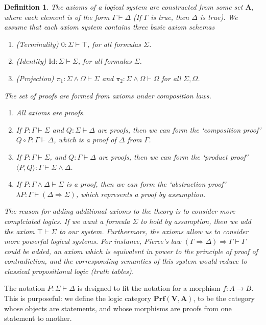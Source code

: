 \documentclass{article}
\theoremstyle{plain}
\newtheorem{definition}{Definition}
\begin{document}
\begin{definition}
    The axioms of a logical system are constructed from some set $\mathbf{A}$, where each element is of the form $\Gamma \vdash \Delta$ (If $\Gamma$ is true, then $\Delta$ is true). We assume that each axiom system contains three basic axiom schemas
    \begin{enumerate}
        \item(Terminality) $0: \Sigma \vdash \top$, for all formulas $\Sigma$.
        \item(Identity) $\text{Id}: \Sigma \vdash \Sigma$, for all formulas $\Sigma$.
        \item(Projection) $\pi_1: \Sigma \wedge \Omega \vdash \Sigma$ and $\pi_2: \Sigma \wedge \Omega \vdash \Omega$ for all $\Sigma, \Omega$.
    \end{enumerate}
    The set of proofs are formed from axioms under composition laws.
    \begin{enumerate}
        \item All axioms are proofs.
        \item If $P: \Gamma \vdash \Sigma$ and $Q: \Sigma \vdash \Delta$ are proofs, then we can form the `composition proof' $Q \circ P: \Gamma \vdash \Delta$, which is a proof of $\Delta$ from $\Gamma$.
        \item If $P: \Gamma \vdash \Sigma$, and $Q: \Gamma \vdash \Delta$ are proofs, then we can form the `product proof' $\langle P,Q \rangle: \Gamma \vdash \Sigma \wedge \Delta$.
        \item If $P: \Gamma \wedge \Delta \vdash \Sigma$ is a proof, then we can form the `abstraction proof' $\lambda P: \Gamma \vdash (\Delta \Rightarrow \Sigma)$, which represents a proof by assumption.
    \end{enumerate}
    The reason for adding additional axioms to the theory is to consider more complciated logics. If we want a formula $\Sigma$ to hold by assumption, then we add the axiom $\top \vdash \Sigma$ to our system. Furthermore, the axioms allow us to consider more powerful logical systems. For instance, Pierce's law $(\Gamma \Rightarrow \Delta) \Rightarrow \Gamma \vdash \Gamma$ could be added, an axiom which is equivalent in power to the principle of proof of contradiction, and the corresponding semantics of this system would reduce to classical propositional logic (truth tables).
\end{definition}

The notation $P: \Sigma \vdash \Delta$ is designed to fit the notation for a morphism $f: A \to B$. This is purposeful: we define the logic category $\mathbf{Prf}(\mathbf{V},\mathbf{A})$, to be the category whose objects are statements, and whose morphisms are proofs from one statement to another.
\end{document}
